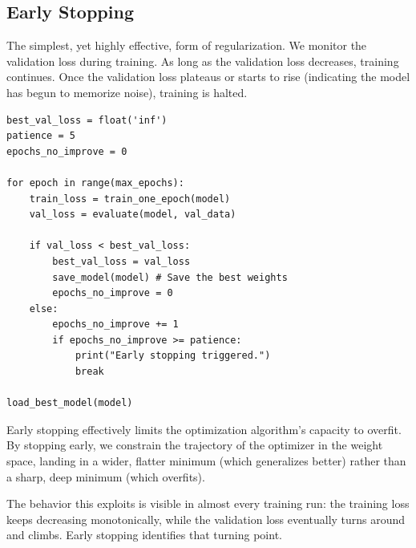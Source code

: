 \documentclass{tufte-handout}
\begin{document}
\subsection{Early Stopping}

The simplest, yet highly effective, form of regularization. We monitor the validation loss during training. As long as the validation loss decreases, training continues. Once the validation loss plateaus or starts to rise (indicating the model has begun to memorize noise), training is halted.

\begin{lstlisting}[caption={Pseudo-code for Early Stopping.}]
best_val_loss = float('inf')
patience = 5
epochs_no_improve = 0

for epoch in range(max_epochs):
    train_loss = train_one_epoch(model)
    val_loss = evaluate(model, val_data)
    
    if val_loss < best_val_loss:
        best_val_loss = val_loss
        save_model(model) # Save the best weights
        epochs_no_improve = 0
    else:
        epochs_no_improve += 1
        if epochs_no_improve >= patience:
            print("Early stopping triggered.")
            break
            
load_best_model(model)
\end{lstlisting}

Early stopping effectively limits the optimization algorithm's capacity to overfit. By stopping early, we constrain the trajectory of the optimizer in the weight space, landing in a wider, flatter minimum (which generalizes better) rather than a sharp, deep minimum (which overfits).

The behavior this exploits is visible in almost every training run: the training loss keeps decreasing monotonically, while the validation loss eventually turns around and climbs. Early stopping identifies that turning point.
\end{document}
